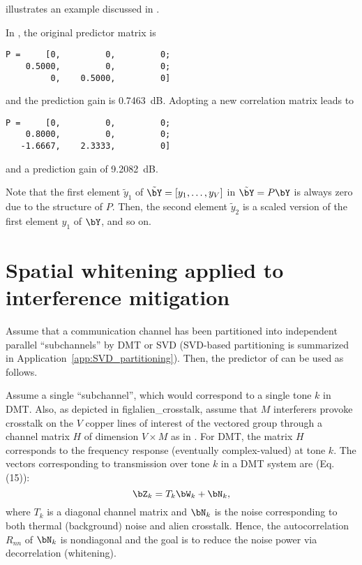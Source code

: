  illustrates an example discussed in \cite{Barry04}.


%

In , the original predictor matrix is 
\begin{verbatim}
P =     [0,         0,         0;
    0.5000,         0,         0;
         0,    0.5000,         0]
\end{verbatim}
and the prediction gain is 0.7463~dB.
Adopting a new correlation matrix 
 leads to
\begin{verbatim}
P =     [0,         0,         0;
    0.8000,         0,         0;
   -1.6667,    2.3333,         0]
\end{verbatim}
and a prediction gain of 9.2082~dB.
	
Note that the first element $\tilde y_1$ of $\tilde{\bY}=[y_1,\ldots,y_V]$ in $\tilde{\bY} = P \bY$ is always zero due to the structure of $P$. Then, the second element $\tilde y_2$ is a scaled version of the first element $y_1$ of $\bY$, and so on.

\ifml %
\else

\section{Spatial whitening applied to interference mitigation}
Assume that a communication channel has been partitioned into independent parallel ``subchannels'' by DMT or SVD (SVD-based partitioning is summarized in Application~\ref{app:SVD_partitioning}). Then, the predictor of  can be used as follows.

Assume a single ``subchannel'', which would correspond to a single tone $k$ in DMT.
Also, as depicted in figl{alien\_crosstalk}, assume that $M$ interferers provoke crosstalk on the $V$ copper lines of interest of the vectored group through a channel matrix $H$ of dimension $V \times M$ as in . For DMT, the matrix $H$ corresponds to the frequency response (eventually complex-valued) at tone $k$. The vectors corresponding to transmission over tone $k$ in a DMT system are \cite{Ginis06} (Eq. (15)):
\begin{equation}
\bZ_k = T_k \bW_k + \bN_k,
\label{eq:dmtVectors}
\end{equation}
where $T_k$ is a diagonal channel matrix and $\bN_k$ is the noise corresponding to both thermal (background) noise and alien crosstalk. Hence, the autocorrelation $R_{nn}$ of $\bN_k$ is nondiagonal and the goal is to reduce the noise power via decorrelation (whitening).

